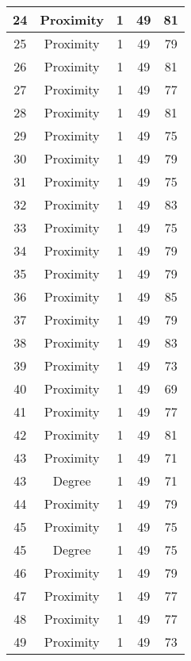 \documentclass[results.tex]{subfiles}
\begin{document}
\begin{center}
\begin{tabular}{| c || c | c | c | c |}
    \hline
    24 & Proximity & 1 & 49 & 81 \\ 
    \hline
    25 & Proximity & 1 & 49 & 79 \\ 
    \hline
    26 & Proximity & 1 & 49 & 81 \\ 
    \hline
    27 & Proximity & 1 & 49 & 77 \\ 
    \hline
    28 & Proximity & 1 & 49 & 81 \\ 
    \hline
    29 & Proximity & 1 & 49 & 75 \\ 
    \hline
    30 & Proximity & 1 & 49 & 79 \\ 
    \hline
    31 & Proximity & 1 & 49 & 75 \\ 
    \hline
    32 & Proximity & 1 & 49 & 83 \\ 
    \hline
    33 & Proximity & 1 & 49 & 75 \\ 
    \hline
    34 & Proximity & 1 & 49 & 79 \\ 
    \hline
    35 & Proximity & 1 & 49 & 79 \\ 
    \hline
    36 & Proximity & 1 & 49 & 85 \\ 
    \hline
    37 & Proximity & 1 & 49 & 79 \\ 
    \hline
    38 & Proximity & 1 & 49 & 83 \\ 
    \hline
    39 & Proximity & 1 & 49 & 73 \\ 
    \hline
    40 & Proximity & 1 & 49 & 69 \\ 
    \hline
    41 & Proximity & 1 & 49 & 77 \\ 
    \hline
    42 & Proximity & 1 & 49 & 81 \\ 
    \hline
    43 & Proximity & 1 & 49 & 71 \\ 
    \hline
    43 & Degree & 1 & 49 & 71 \\ 
    \hline
    44 & Proximity & 1 & 49 & 79 \\ 
    \hline
    45 & Proximity & 1 & 49 & 75 \\ 
    \hline
    45 & Degree & 1 & 49 & 75 \\ 
    \hline
    46 & Proximity & 1 & 49 & 79 \\ 
    \hline
    47 & Proximity & 1 & 49 & 77 \\ 
    \hline
    48 & Proximity & 1 & 49 & 77 \\ 
    \hline
    49 & Proximity & 1 & 49 & 73 \\ 
    \hline   \end{tabular}
\end{center}
\end{document}
